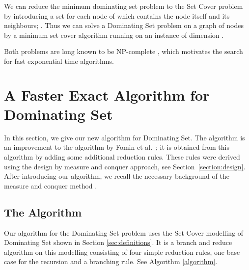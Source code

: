 \documentclass[fleqn]{stacs_proc}
\begin{document}
We can reduce the minimum dominating set problem to the
{\sc Set Cover} problem by introducing a set for each node of  which contains
the node itself and its neighbours; .
Thus we can solve a {\sc Dominating Set} problem on a graph of  nodes by a
minimum set cover algorithm running on an instance of dimension .

Both problems are long known to be NP-complete \cite{GareyJ79,Karp72}, which motivates
the search for fast exponential time algorithms.






\section{A Faster Exact Algorithm for Dominating Set} \label{sec:m&calgorithm}
In this section, we give our new algorithm for {\sc Dominating Set}. The
algorithm is an improvement to the algorithm by Fomin et
al.~\cite{FominGK05a}; it is obtained from this algorithm by adding some
additional reduction rules. These rules were derived using the design by
measure and conquer approach, see Section~\ref{section:design}. After
introducing our algorithm, we recall the necessary background of the measure
and conquer method \cite{FominGK05a}. 




\subsection{The Algorithm}
Our algorithm for the {\sc Dominating Set} problem uses the {\sc Set Cover}
modelling of {\sc Dominating Set} shown in Section \ref{sec:definitions}.
It is a branch and reduce algorithm on this modelling consisting of four simple reduction rules,
one base case for the recursion and a branching rule. See Algorithm \ref{algorithm}.
\end{document}
